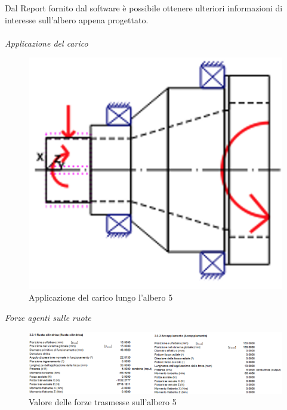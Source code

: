 Dal Report fornito dal software è possibile ottenere ulteriori informazioni di interesse sull'albero appena progettato. \\
\\
\emph{Applicazione del carico}
\begin{figure}[h]
    \centering
    \includegraphics[scale=0.6]{Immagini/CaricoAlbero5.png}
    \caption{Applicazione del carico lungo l'albero 5}
    \label{fig:CaricoAlbero5}
\end{figure}
\newpage
\emph{Forze agenti sulle ruote}
\begin{figure}[h]
    \centering
    \includegraphics[scale=0.5]{Immagini/ForzeRuoteAlbero5.png}
    \caption{Valore delle forze trasmesse sull'albero 5}
    \label{fig:ForzeRuoteAlbero5}
\end{figure}


